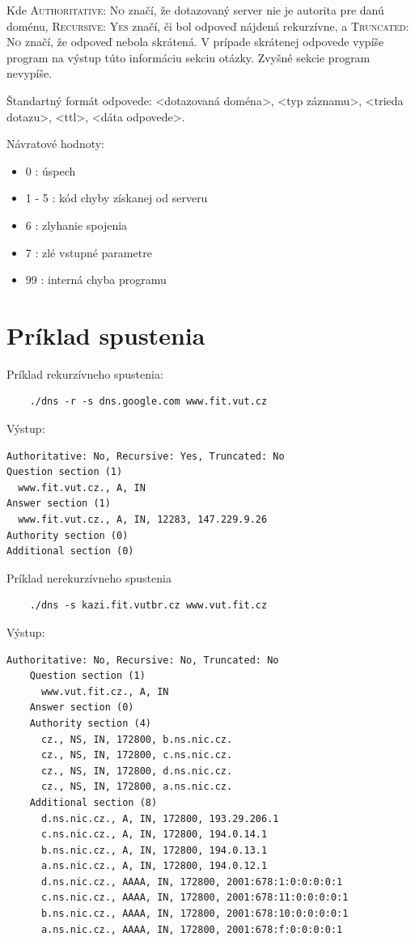 Kde \textsc{Authoritative: No} značí, že dotazovaný server nie je autorita pre danú doménu, \textsc{Recursive: Yes} značí, či bol odpoveď nájdená rekurzívne,
a \textsc{Truncated: No} značí, že odpoveď nebola skrátená. V prípade skrátenej odpovede vypíše program na výstup túto informáciu sekciu otázky. Zvyšné sekcie program nevypíše.

\noindent Štandartný formát odpovede: <dotazovaná doména>, <typ záznamu>, <trieda dotazu>, <ttl>, <dáta odpovede>. 

Návratové hodnoty:
\begin{itemize}
    \item 0 : úspech
    \item 1 - 5 : kód chyby získanej od serveru
    \item 6 : zlyhanie spojenia
    \item 7 : zlé vstupné parametre
    \item 99 : interná chyba programu
\end{itemize}


\section{Príklad spustenia}
\label{Príklad spustenia}

Príklad rekurzívneho spustenia:

\begin{verbatim}
    ./dns -r -s dns.google.com www.fit.vut.cz  
\end{verbatim}

\noindent Výstup:

\begin{verbatim}
Authoritative: No, Recursive: Yes, Truncated: No
Question section (1)
  www.fit.vut.cz., A, IN
Answer section (1)
  www.fit.vut.cz., A, IN, 12283, 147.229.9.26
Authority section (0)
Additional section (0)
\end{verbatim}

Príklad nerekurzívneho spustenia

\begin{verbatim}
    ./dns -s kazi.fit.vutbr.cz www.vut.fit.cz
\end{verbatim}

\noindent Výstup:
\begin{verbatim}
Authoritative: No, Recursive: No, Truncated: No
    Question section (1)
      www.vut.fit.cz., A, IN
    Answer section (0)
    Authority section (4)
      cz., NS, IN, 172800, b.ns.nic.cz.
      cz., NS, IN, 172800, c.ns.nic.cz.
      cz., NS, IN, 172800, d.ns.nic.cz.
      cz., NS, IN, 172800, a.ns.nic.cz.
    Additional section (8)
      d.ns.nic.cz., A, IN, 172800, 193.29.206.1
      c.ns.nic.cz., A, IN, 172800, 194.0.14.1
      b.ns.nic.cz., A, IN, 172800, 194.0.13.1
      a.ns.nic.cz., A, IN, 172800, 194.0.12.1
      d.ns.nic.cz., AAAA, IN, 172800, 2001:678:1:0:0:0:0:1
      c.ns.nic.cz., AAAA, IN, 172800, 2001:678:11:0:0:0:0:1
      b.ns.nic.cz., AAAA, IN, 172800, 2001:678:10:0:0:0:0:1
      a.ns.nic.cz., AAAA, IN, 172800, 2001:678:f:0:0:0:0:1
\end{verbatim}

